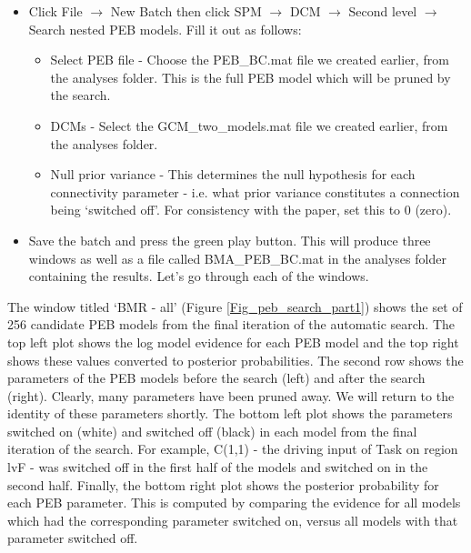 \documentclass{article}
\begin{document}
\begin{itemize}
    \item Click File $\rightarrow$ New Batch then click SPM $\rightarrow$ DCM $\rightarrow$ Second level $\rightarrow$ Search nested PEB models. Fill it out as follows:
    \begin{itemize}
        \item Select PEB file - Choose the PEB\_BC.mat file we created earlier, from the analyses folder. This is the full PEB model which will be pruned by the search.
        \item DCMs - Select the GCM\_two\_models.mat file we created earlier, from the analyses folder.
        \item Null prior variance - This determines the null hypothesis for each connectivity parameter - i.e. what prior variance constitutes a connection being `switched off'. For consistency with the paper, set this to 0 (zero).
    \end{itemize}
    \item Save the batch and press the green play button. This will produce three windows as well as a file called BMA\_PEB\_BC.mat in the analyses folder containing the results. Let's go through each of the windows.
\end{itemize}


The window titled `BMR - all' (Figure \ref{Fig_peb_search_part1}) shows the set of 256 candidate PEB models from the final iteration of the automatic search. The top left plot shows the log model evidence for each PEB model and the top right shows these values converted to posterior probabilities. The second row shows the parameters of the PEB models before the search (left) and after the search (right). Clearly, many parameters have been pruned away. We will return to the identity of these parameters shortly. The bottom left plot shows the parameters switched on (white) and switched off (black) in each model from the final iteration of the search. For example, C(1,1) - the driving input of Task on region lvF - was switched off in the first half of the models and switched on in the second half. Finally, the bottom right plot shows the posterior probability for each PEB parameter. This is computed by comparing the evidence for all models which had the corresponding parameter switched on, versus all models with that parameter switched off.
\end{document}
